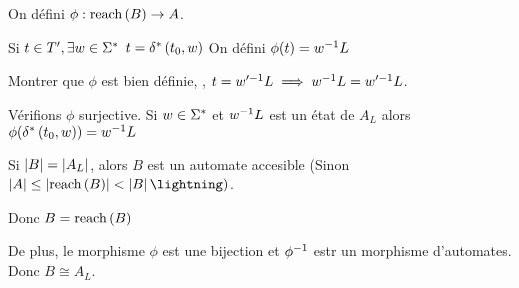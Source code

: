 \begin{exercice}
	On défini $\phi : \text{reach}\left(B\right) \to A$.

	Si $t \in T', \exists w \in \Sigma^{*}$ \tq $ t = \delta^{*} \left(t_0,w\right)$
	On défini $\phi (t) = w^{-1} L$

	Montrer que $\phi$ est bien définie, \ie, $t = w'^{-1} L \implies w^{-1} L = w'^{-1} L$.

	Vérifions $\phi$ surjective. Si $w \in \Sigma^{*}$ et $w^{-1} L$ est un état de $A_L$ alors $\phi (\delta^{*} \left(t_0,w\right)) = w^{-1} L$

	Si $\left|B\right| = \left|A_L\right|$, alors $B$ est un automate accesible
	(Sinon $\abs A \leq \abs {\reach B} < \abs B \lightning)$.

	Donc $B = \text{reach}\left(B\right)$

	De plus, le morphisme $\phi$ est une bijection et $\phi^{-1}$ estr un morphisme d'automates.
	Donc $B \cong A_L$.

\end{exercice}

